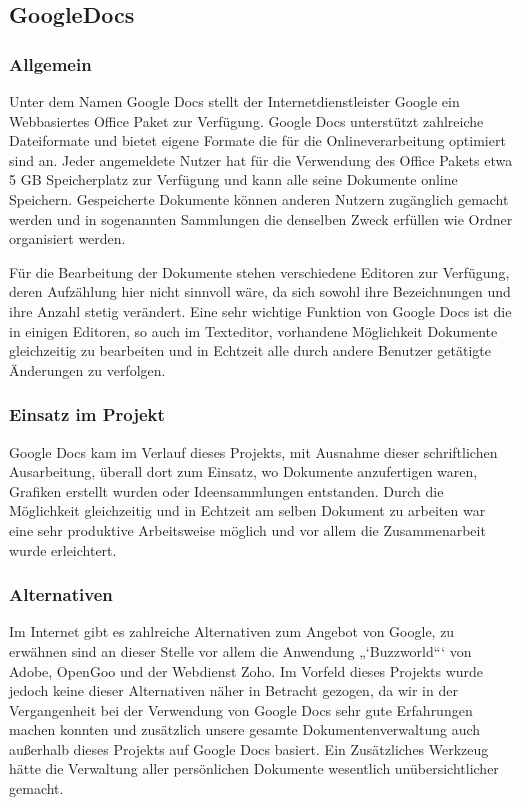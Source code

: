 \subsection{GoogleDocs}
\subsubsection{Allgemein}
Unter dem Namen Google Docs stellt der Internetdienstleister Google ein Webbasiertes Office Paket zur Verfügung. Google Docs unterstützt zahlreiche Dateiformate und bietet eigene Formate die für die Onlineverarbeitung optimiert sind an. Jeder angemeldete Nutzer hat für die Verwendung des Office Pakets etwa 5 GB Speicherplatz zur Verfügung und kann alle seine Dokumente online Speichern. 
Gespeicherte Dokumente können anderen Nutzern zugänglich gemacht werden und in sogenannten Sammlungen die denselben Zweck erfüllen wie Ordner organisiert werden.

Für die Bearbeitung der Dokumente stehen verschiedene Editoren zur Verfügung, deren Aufzählung hier nicht sinnvoll wäre, da sich sowohl ihre Bezeichnungen und ihre Anzahl stetig verändert.
Eine sehr wichtige Funktion von Google Docs ist die in einigen Editoren, so auch im Texteditor, vorhandene Möglichkeit Dokumente gleichzeitig zu bearbeiten und in Echtzeit alle durch andere Benutzer getätigte Änderungen zu verfolgen.
\subsubsection{Einsatz im Projekt}
Google Docs kam im Verlauf dieses Projekts, mit Ausnahme dieser schriftlichen Ausarbeitung, überall dort zum Einsatz, wo Dokumente anzufertigen waren, Grafiken erstellt wurden oder Ideensammlungen entstanden. Durch die Möglichkeit gleichzeitig und in Echtzeit am selben Dokument zu arbeiten war eine sehr produktive Arbeitsweise möglich und vor allem die Zusammenarbeit wurde erleichtert.  
\subsubsection{Alternativen}
Im Internet gibt es zahlreiche Alternativen zum Angebot von Google, zu erwähnen sind an dieser Stelle vor allem die Anwendung  „‘Buzzworld“‘ von Adobe, OpenGoo und der Webdienst Zoho. Im Vorfeld dieses Projekts wurde jedoch keine dieser Alternativen näher in Betracht gezogen, da wir in der Vergangenheit bei der Verwendung von Google Docs sehr gute Erfahrungen machen konnten und zusätzlich unsere gesamte Dokumentenverwaltung auch außerhalb dieses Projekts auf Google Docs basiert. Ein Zusätzliches Werkzeug hätte die Verwaltung aller persönlichen Dokumente wesentlich unübersichtlicher gemacht.
